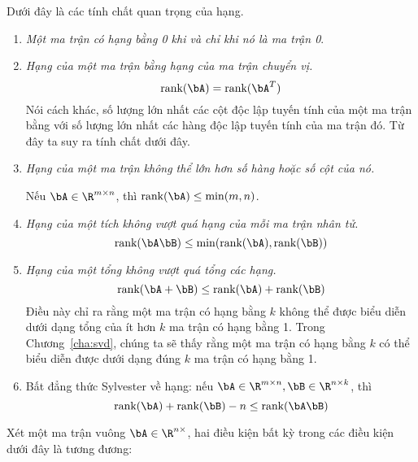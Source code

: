 Dưới đây là các tính chất quan trọng của hạng.
\begin{enumerate}

    \item \textit{Một ma trận có hạng bằng 0 khi và chỉ khi nó là ma trận 0}.

    \item \textit{Hạng của một ma trận bằng hạng của ma trận chuyển vị.}
        $$\rank(\bA) = \rank(\bA^T)$$ Nói cách khác, số lượng lớn nhất các cột
        độc lập tuyến tính của một ma trận bằng với số lượng lớn nhất các hàng
        độc lập tuyến tính của ma trận đó. Từ đây ta suy ra tính chất dưới đây.

    \item \textit{Hạng của một ma trận không thể lớn hơn số hàng hoặc số cột
        của nó.}

    Nếu $\bA \in \R^{m \times n}$, thì $\rank(\bA) \leq \min(m, n)$.

    \item \textit{Hạng của một tích không vượt quá hạng của mỗi ma trận nhân tử.} 
    $$\rank(\bA\bB) \leq \min(\rank(\bA), \rank(\bB))$$

    \item \textit{Hạng của một tổng không vượt quá tổng các hạng.}
    \begin{equation}
        \rank(\bA + \bB) \leq \rank(\bA) + \rank(\bB)        
    \end{equation}
    Điều này chỉ ra rằng một ma trận có hạng bằng $k$ không thể được biểu diễn dưới
    dạng tổng của ít hơn $k$ ma trận có hạng bằng 1. Trong Chương~\ref{cha:svd},
    chúng ta sẽ thấy rằng một ma trận có hạng bằng $k$ có thể biểu diễn được
    dưới dạng đúng $k$ ma trận có hạng bằng 1. %


    \item Bất đẳng thức Sylvester về hạng: nếu $\bA \in \R^{m\times n}, \bB \in
    \R^{n \times k}$, thì $$\rank{(\bA)} + \rank{(\bB)} - n \leq \rank{(\bA\bB)}$$


\end{enumerate}
Xét một ma trận vuông $\bA \in \R^{n\times }$, hai điều kiện bất kỳ trong các điều kiện dưới đây là tương đương:



